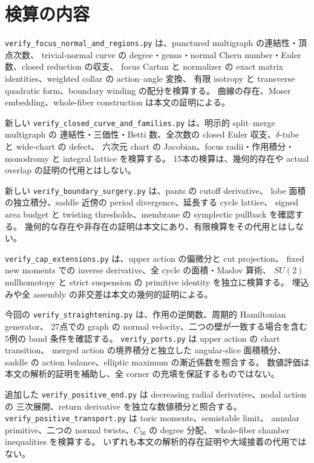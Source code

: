 \documentclass[11pt,a4paper]{article}
\theoremstyle{definition}
\begin{document}
\appendix
\section{検算の内容}


\texttt{verify\_focus\_normal\_and\_regions.py} は、punctured multigraph の連結性・頂点次数、
trivial-normal curve の degree・genus・normal Chern number・Euler 数、closed reduction の収支、
focus Cartan と normalizer の exact matrix identities、weighted collar の action--angle 変換、
有限 isotropy と transverse quadratic form、boundary winding の配分を検算する。
曲線の存在、Moser embedding、whole-fiber construction は本文の証明による。

新しい \texttt{verify\_closed\_curve\_and\_families.py} は、明示的 split--merge multigraph の
連結性・三価性・Betti 数、全次数の closed Euler 収支、$\delta$-tube と wide-chart の defect、
六次元 chart の Jacobian、focus radii・作用積分・monodromy と integral lattice を検算する。
15本の検算は、幾何的存在や actual overlap の証明の代用とはしない。


新しい \texttt{verify\_boundary\_surgery.py} は、pants の cutoff derivative、
lobe 面積の独立積分、saddle 近傍の period divergence、延長する cycle lattice、
signed area budget と twisting thresholds、membrane の symplectic pullback を確認する。
幾何的な存在や非存在の証明は本文にあり、有限検算をその代用とはしない。

\texttt{verify\_cap\_extensions.py} は、upper action の偏微分と cut projection、
fixed new moments での inverse derivative、全 cycle の面積・Maslov 算術、
$SU(2)$ nullhomotopy と strict suspension の primitive identity を独立に検算する。
埋込みや全 assembly の非交差は本文の幾何的証明による。

今回の \texttt{verify\_straightening.py} は、作用の逆関数、周期的 Hamiltonian generator、
27点での graph の normal velocity、二つの壁が一致する場合を含む5例の band 条件を確認する。
\texttt{verify\_ports.py} は upper action の chart transition、
merged action の境界積分と独立した angular-slice 面積積分、
saddle の action balance、elliptic maximum の漸近係数を照合する。
数値評価は本文の解析的証明を補助し、全 corner の充填を保証するものではない。


追加した \texttt{verify\_positive\_end.py} は decreasing radial derivative、nodal action の
三次展開、return derivative を独立な数値積分と照合する。
\texttt{verify\_positive\_transport.py} は toric moments、semistable limit、
annular primitive、二つの normal twists、$C_{56}$ の degree 分配、
whole-fiber chamber inequalities を検算する。
いずれも本文の解析的存在証明や大域接着の代用ではない。
\end{document}
